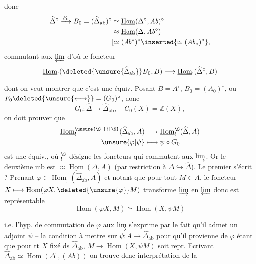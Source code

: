 
donc
\[
\begin{aligned}
\widehat\Delta^{\circ}\xrightarrow{F_0}B_0
=(\widehat\Delta_{\mathrm{ab}})^{\circ}
&\simeq\underline{\operatorname{Hom}}(\Delta^{\circ},\mathit{Ab})^{\circ}\\
&\approx\underline{\operatorname{Hom}}(\Delta,\mathit{Ab}^{\circ})\\
&[\simeq(\mathit{Ab}^{\circ})^{\ast}\inserted{\simeq(\mathit{Ab}_{\ast})^{\circ}},
\end{aligned}
\]
\inserted{dans le cas qui nous intéresse]} commutant aux $\varprojlim$
d'où le foncteur
\[
\underline{\operatorname{Hom}}_{!}(\deleted{\unsure{\widehat\Delta_{\mathrm{ab}}}}B_0,B)
\longrightarrow\underline{\operatorname{Hom}}_{!}(\widehat\Delta^{\circ},B)
\]

dont on veut montrer que c'est une équiv. Posant
$B=A^{\circ}$, $B_0=(A_0)^{\circ}$, ou $F_0\deleted{\unsure{\longleftrightarrow}}=(G_0)^{\circ}$, donc
\[
G_0:\widehat\Delta\longrightarrow\widehat\Delta_{\mathrm{ab}},\quad G_0(X)=\mathbb Z(X),
\]
on doit prouver que
\[
\begin{aligned}
\underline{\operatorname{Hom}}_{!}^{\unsure{\S|!|\$}}(\widehat\Delta_{\mathrm{ab}},A)&\longrightarrow
\underline{\operatorname{Hom}}_{!}^{\S}(\widehat\Delta,A)\\
\unsure{\varphi|\psi}&\longmapsto\psi\circ G_0
\end{aligned}
\]
est une équiv., où $ {}_{!}^{\S}$ désigne les foncteurs
qui commutent aux $\varinjlim$. Or
le deuxième mb est $\approx\underline{\operatorname{Hom}}(\Delta,A)$
(par restriction à $\Delta\hookrightarrow\widehat\Delta$).  Le
premier s'écrit ?  Prenant $\varphi\in\underline{\operatorname{Hom}}_{!}(\widehat\Delta_{\mathrm{ab}},A)$
et notant que pour tout $M\in A$,  le
foncteur $X\longmapsto\operatorname{Hom}(\varphi X,\deleted{\unsure{\varphi}}M)$ transforme $\varinjlim$
en $\varprojlim$ donc est représentable
\[
\operatorname{Hom}(\varphi X,M)\simeq\operatorname{Hom}(X,\psi M)
\]

i.e. l'hyp. de commutation de $\varphi$ aux $\varinjlim$
s'exprime par le fait qu'il admet un
adjoint $\psi$ -- la condition à mettre sur \deleted{$\unsure{\varphi}$}
$\psi:A\longrightarrow\widehat\Delta_{\mathrm{ab}}$ pour qu'il provienne de $\varphi$
étant que pour tt $X$ fixé ds $\widehat\Delta_{\mathrm{ab}}$, $M\longrightarrow\operatorname{Hom}(X,\psi M)$
soit repr. Ecrivant $\widehat\Delta_{\mathrm{ab}}\simeq\operatorname{Hom}(\Delta^{\circ},(\mathit{Ab}))$
on trouve donc interprétation de la

